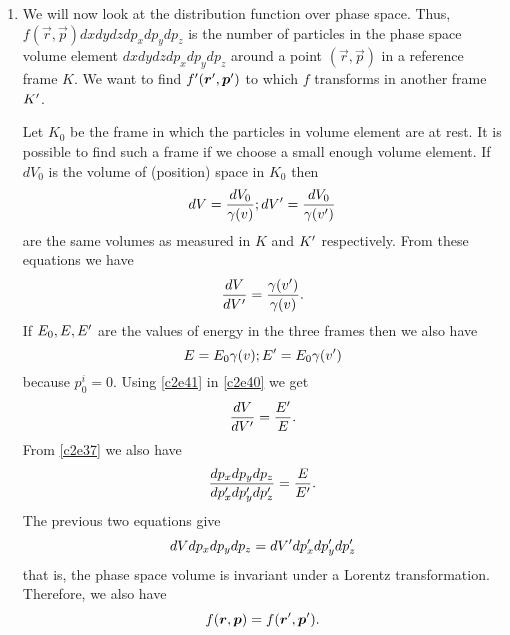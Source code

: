 \begin{enumerate}
\item We will now look at the distribution function over phase space. Thus,
$f(\vec{r}, \vec{p})dxdydzdp_xdp_ydp_z$ is the number of particles in the phase
space volume element $dxdydzdp_xdp_ydp_z$ around a point $(\vec{r}, \vec{p})$ in
a reference frame $K$. We want to find $f^\prime(\boldsymbol{r}^\prime, \boldsymbol{p}^\prime)$ to which
$f$ transforms in another frame $K^\prime$.

Let $K_0$ be the frame in which the particles in volume element are at rest. It
is possible to find such a frame if we choose a small enough volume element. If
$dV_0$ is the volume of (position) space in $K_0$ then
\begin{equation}\label{c2e39}
dV = \frac{dV_0}{\gamma(v)}; dV^\prime = \frac{dV_0}{\gamma(v^\prime)}
\end{equation}
are the same volumes as measured in $K$ and $K^\prime$ respectively. From these 
equations we have
\begin{equation}\label{c2e40}
\frac{dV}{dV^\prime} = \frac{\gamma(v^\prime)}{\gamma(v)}.
\end{equation}
If $E_0, E, E^\prime$ are the values of energy in the three frames then we also
have
\begin{equation}\label{c2e41}
E = E_0\gamma(v); E^\prime = E_0\gamma(v^\prime)
\end{equation}
because $p_0^i = 0$. Using \eqref{c2e41} in \eqref{c2e40} we get
\begin{equation}\label{c2e42}
\frac{dV}{dV^\prime}  = \frac{E^\prime}{E}.
\end{equation}
From \eqref{c2e37} we also have
\begin{equation}\label{c2e43}
\frac{dp_xdp_ydp_z}{dp_x^\prime dp_y^\prime dp_z^\prime} = \frac{E}{E^\prime}.
\end{equation}
The previous two equations give
\begin{equation}\label{c2e44}
dVdp_xdp_ydp_z = dV^\prime dp_x^\prime dp_y^\prime dp_z^\prime
\end{equation}
that is, the phase space volume is invariant under a Lorentz transformation. 
Therefore, we also have
\begin{equation}\label{c2e45}
f(\boldsymbol{r}, \boldsymbol{p}) = f(\boldsymbol{r}^\prime, \boldsymbol{p}^\prime).
\end{equation}


\end{enumerate}
